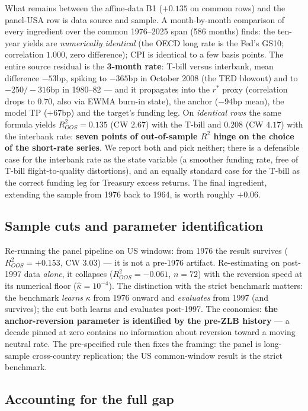 \documentclass[11pt]{article}
\begin{document}
What remains between the affine-data B1 ($+0.135$ on common rows) and the panel-USA row is
data source and sample. A month-by-month comparison of every ingredient over the common
1976--2025 span (586 months) finds: the ten-year yields are \emph{numerically identical}
(the OECD long rate is the Fed's GS10; correlation $1.000$, zero difference); CPI is
identical to a few basis points. The entire source residual is the \textbf{3-month rate}:
T-bill versus interbank, mean difference $-53$bp, spiking to $-365$bp in October 2008 (the
TED blowout) and to $-250/-316$bp in 1980--82 --- and it propagates into the $r^*$ proxy
(correlation drops to $0.70$, also via EWMA burn-in state), the anchor ($-94$bp mean), the
model TP ($+67$bp) and the target's funding leg. On \emph{identical rows} the same formula
yields $R^2_{OOS}=0.135$ (CW $2.67$) with the T-bill and $0.208$ (CW $4.17$) with the
interbank rate: \textbf{seven points of out-of-sample $R^2$ hinge on the choice of the
short-rate series}. We report both and pick neither; there is a defensible case for the
interbank rate as the state variable (a smoother funding rate, free of T-bill
flight-to-quality distortions), and an equally standard case for the T-bill as the correct
funding leg for Treasury excess returns. The final ingredient, extending the sample from
1976 back to 1964, is worth roughly $+0.06$.

\subsection{Sample cuts and parameter identification}

Re-running the panel pipeline on US windows: from 1976 the result survives
($R^2_{OOS}=+0.153$, CW $3.03$) --- it is not a pre-1976 artifact. Re-estimating on
post-1997 data \emph{alone}, it collapses ($R^2_{OOS}=-0.061$, $n=72$) with the reversion
speed at its numerical floor ($\hat\kappa=10^{-4}$). The distinction with the strict
benchmark matters: the benchmark \emph{learns} $\kappa$ from 1976 onward and
\emph{evaluates} from 1997 (and survives); the cut both learns and evaluates post-1997.
The economics: \textbf{the anchor-reversion parameter is identified by the pre-ZLB
history} --- a decade pinned at zero contains no information about reversion toward a
moving neutral rate. The pre-specified rule then fixes the framing: the panel is
long-sample cross-country replication; the US common-window result is the strict
benchmark.

\subsection{Accounting for the full gap}
\end{document}
